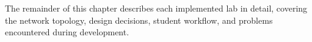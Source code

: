 The remainder of this chapter describes each implemented lab in detail, covering
the network topology, design decisions, student workflow, and problems encountered
during development.




